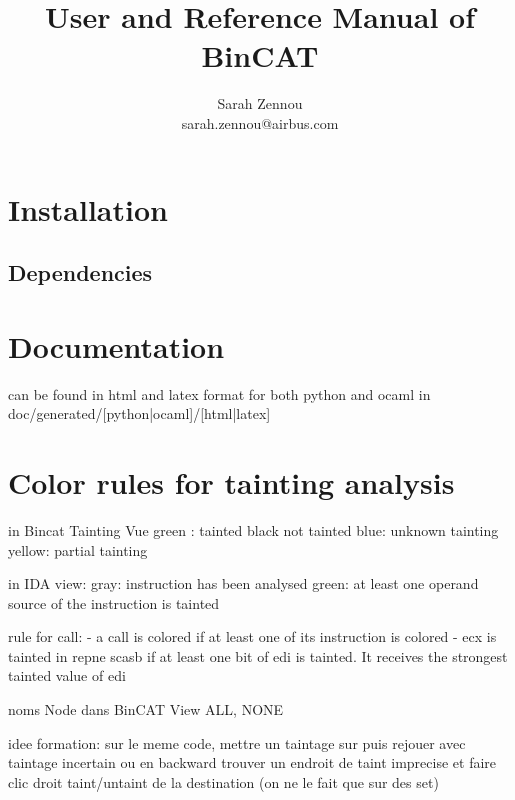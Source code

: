 \documentclass{report}
\title{User and Reference Manual of BinCAT}
\author{Sarah Zennou\\sarah.zennou@airbus.com}
\begin{document}
\maketitle
\tableofcontents
\chapter{Installation}

\section{Dependencies}
\chapter{Documentation}

can be found in html and latex format for both python and ocaml \newline
in doc/generated/[python|ocaml]/[html|latex]

\chapter{Color rules for tainting analysis}
in Bincat Tainting Vue
green : tainted
black not tainted
blue: unknown tainting
yellow: partial tainting

in IDA view:
gray: instruction has been analysed
green: at least one operand source of the instruction is tainted

rule for call:
- a call is colored if at least one of its instruction is colored
- ecx is tainted in repne scasb if at least one bit of edi is tainted. It receives the strongest tainted value of edi

noms Node dans BinCAT View
ALL, NONE

idee formation:
sur le meme code, mettre un taintage sur puis rejouer avec taintage incertain ou en backward
trouver un endroit de taint imprecise et faire clic droit taint/untaint de la destination (on ne le fait que sur des set)
\end{document}
